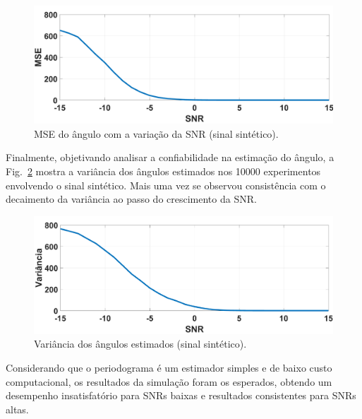 \documentclass{sbrt2017port}
\begin{document}
\begin{figure}[!htb]
     \centering
     \includegraphics[width=\linewidth]{images/emq_vs_snr}
     \caption{MSE do ângulo com a variação da SNR (sinal sintético).}
     \label{fig:rmse_snr}
\end{figure}

Finalmente, objetivando analisar a confiabilidade na estimação do ângulo, a Fig.~\ref{fig:var_snr} mostra a variância dos ângulos estimados nos 10000 experimentos envolvendo o sinal sintético. Mais uma vez se observou consistência com o decaimento da variância ao passo do crescimento da SNR.



\begin{figure}[!htb]
     \centering
     \includegraphics[width=\linewidth]{images/var_vs_snr}
     \caption{Variância dos ângulos estimados (sinal sintético).}
     \label{fig:var_snr}
\end{figure}

Considerando que o periodograma é um estimador simples e de baixo custo computacional, os resultados da simulação foram os esperados, obtendo um desempenho insatisfatório para SNRs baixas e resultados consistentes para SNRs altas.  
 
\end{document}
